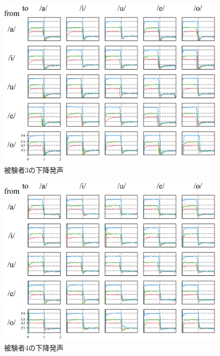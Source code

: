 \documentclass[10.5ptj,a4j,dvipdfmx,uplatex, oneside, openany, report]{jsbook}%
\begin{document}
\begin{figure}[htbp]
    \begin{center}
      \includegraphics[clip,width=12.0cm]{down3.png}
      \caption{被験者3の下降発声}
      \label{fig:d3}
    \end{center}

\end{figure}\begin{figure}[htbp]
    \begin{center}
      \includegraphics[clip,width=12.0cm]{down4.png}
      \caption{被験者4の下降発声}
      \label{fig:d4}
    \end{center}
\end{figure}
\end{document}
